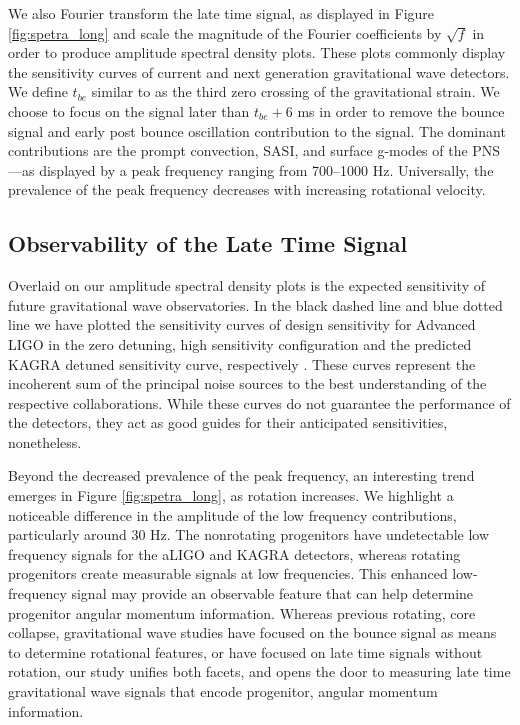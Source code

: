 \documentclass[twocolumn,times]{aastex62}  %
\begin{document}
We also Fourier transform the late time signal, as displayed in Figure \ref{fig:spetra_long} and scale the magnitude of the Fourier coefficients by $\sqrt{f}$ in order to produce amplitude spectral density plots.  These plots commonly display the sensitivity curves of current and next generation gravitational wave detectors.  We define $t_{be}$ similar to \citet{richers:2017} as the third zero crossing of the gravitational strain.  We choose to focus on the signal later than $t_{be} + 6$ ms in order to remove the bounce signal and early post bounce oscillation contribution to the signal.  
The dominant contributions are the prompt convection, SASI, and surface g-modes of the PNS---as displayed by a peak frequency ranging from 700--1000 Hz.  Universally, the prevalence of the peak frequency decreases with increasing rotational velocity.  

\subsection{Observability of the Late Time Signal}

Overlaid on our amplitude spectral density plots is the expected sensitivity of future gravitational wave observatories.  
In the black dashed line and blue dotted line we have plotted the sensitivity curves of design sensitivity for Advanced LIGO in the zero detuning, high sensitivity configuration and the predicted KAGRA detuned sensitivity curve, respectively \citep{komari:2017,barsotti:2018}.
These curves represent the incoherent sum of the principal noise sources to the best understanding of the respective collaborations.  While these curves do not guarantee the performance of the detectors, they act as good guides for their anticipated sensitivities, nonetheless. 




Beyond the decreased prevalence of the peak frequency, an interesting trend emerges in Figure \ref{fig:spetra_long}, as rotation increases.  
We highlight a noticeable difference in the amplitude of the low frequency contributions, particularly around 30 Hz.  The nonrotating progenitors have undetectable low frequency signals for the aLIGO and KAGRA detectors, whereas rotating progenitors create measurable signals at low frequencies. 
This enhanced low-frequency signal may provide an observable feature that can help determine progenitor angular momentum information.  
Whereas previous rotating, core collapse, gravitational wave studies have focused on the bounce signal as means to determine rotational features, or have focused on late time signals without rotation, our study unifies both facets, and opens the door to measuring late time gravitational wave signals that encode progenitor, angular momentum information. 
\end{document}
